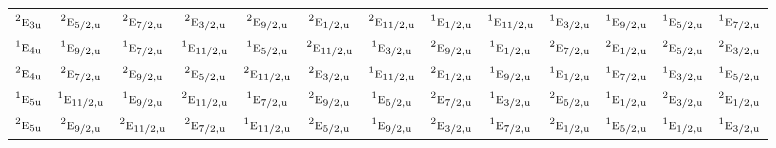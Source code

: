 \documentclass[10pt,a4paper]{article}
\numberwithin{equation}{section}
\newcommand{\irr}[1]{\text{\normalfont\scshape #1}}
\newcommand{\conjpair}[1]{{}^{#1}}
\newcommand{\ptag}[1]{\mathrm{#1}}
\begin{document}
{\begin{longtable}{@{}lcccccccccccc@{}}
$\conjpair{2}\irr{e}_{3\ptag{u}}$ & $\conjpair{2}\irr{e}_{5/2,\ptag{u}}$ & $\conjpair{2}\irr{e}_{7/2,\ptag{u}}$ & $\conjpair{2}\irr{e}_{3/2,\ptag{u}}$ & $\conjpair{2}\irr{e}_{9/2,\ptag{u}}$ & $\conjpair{2}\irr{e}_{1/2,\ptag{u}}$ & $\conjpair{2}\irr{e}_{11/2,\ptag{u}}$ & $\conjpair{1}\irr{e}_{1/2,\ptag{u}}$ & $\conjpair{1}\irr{e}_{11/2,\ptag{u}}$ & $\conjpair{1}\irr{e}_{3/2,\ptag{u}}$ & $\conjpair{1}\irr{e}_{9/2,\ptag{u}}$ & $\conjpair{1}\irr{e}_{5/2,\ptag{u}}$ & $\conjpair{1}\irr{e}_{7/2,\ptag{u}}$\\
$\conjpair{1}\irr{e}_{4\ptag{u}}$ & $\conjpair{1}\irr{e}_{9/2,\ptag{u}}$ & $\conjpair{1}\irr{e}_{7/2,\ptag{u}}$ & $\conjpair{1}\irr{e}_{11/2,\ptag{u}}$ & $\conjpair{1}\irr{e}_{5/2,\ptag{u}}$ & $\conjpair{2}\irr{e}_{11/2,\ptag{u}}$ & $\conjpair{1}\irr{e}_{3/2,\ptag{u}}$ & $\conjpair{2}\irr{e}_{9/2,\ptag{u}}$ & $\conjpair{1}\irr{e}_{1/2,\ptag{u}}$ & $\conjpair{2}\irr{e}_{7/2,\ptag{u}}$ & $\conjpair{2}\irr{e}_{1/2,\ptag{u}}$ & $\conjpair{2}\irr{e}_{5/2,\ptag{u}}$ & $\conjpair{2}\irr{e}_{3/2,\ptag{u}}$\\
$\conjpair{2}\irr{e}_{4\ptag{u}}$ & $\conjpair{2}\irr{e}_{7/2,\ptag{u}}$ & $\conjpair{2}\irr{e}_{9/2,\ptag{u}}$ & $\conjpair{2}\irr{e}_{5/2,\ptag{u}}$ & $\conjpair{2}\irr{e}_{11/2,\ptag{u}}$ & $\conjpair{2}\irr{e}_{3/2,\ptag{u}}$ & $\conjpair{1}\irr{e}_{11/2,\ptag{u}}$ & $\conjpair{2}\irr{e}_{1/2,\ptag{u}}$ & $\conjpair{1}\irr{e}_{9/2,\ptag{u}}$ & $\conjpair{1}\irr{e}_{1/2,\ptag{u}}$ & $\conjpair{1}\irr{e}_{7/2,\ptag{u}}$ & $\conjpair{1}\irr{e}_{3/2,\ptag{u}}$ & $\conjpair{1}\irr{e}_{5/2,\ptag{u}}$\\
$\conjpair{1}\irr{e}_{5\ptag{u}}$ & $\conjpair{1}\irr{e}_{11/2,\ptag{u}}$ & $\conjpair{1}\irr{e}_{9/2,\ptag{u}}$ & $\conjpair{2}\irr{e}_{11/2,\ptag{u}}$ & $\conjpair{1}\irr{e}_{7/2,\ptag{u}}$ & $\conjpair{2}\irr{e}_{9/2,\ptag{u}}$ & $\conjpair{1}\irr{e}_{5/2,\ptag{u}}$ & $\conjpair{2}\irr{e}_{7/2,\ptag{u}}$ & $\conjpair{1}\irr{e}_{3/2,\ptag{u}}$ & $\conjpair{2}\irr{e}_{5/2,\ptag{u}}$ & $\conjpair{1}\irr{e}_{1/2,\ptag{u}}$ & $\conjpair{2}\irr{e}_{3/2,\ptag{u}}$ & $\conjpair{2}\irr{e}_{1/2,\ptag{u}}$\\
$\conjpair{2}\irr{e}_{5\ptag{u}}$ & $\conjpair{2}\irr{e}_{9/2,\ptag{u}}$ & $\conjpair{2}\irr{e}_{11/2,\ptag{u}}$ & $\conjpair{2}\irr{e}_{7/2,\ptag{u}}$ & $\conjpair{1}\irr{e}_{11/2,\ptag{u}}$ & $\conjpair{2}\irr{e}_{5/2,\ptag{u}}$ & $\conjpair{1}\irr{e}_{9/2,\ptag{u}}$ & $\conjpair{2}\irr{e}_{3/2,\ptag{u}}$ & $\conjpair{1}\irr{e}_{7/2,\ptag{u}}$ & $\conjpair{2}\irr{e}_{1/2,\ptag{u}}$ & $\conjpair{1}\irr{e}_{5/2,\ptag{u}}$ & $\conjpair{1}\irr{e}_{1/2,\ptag{u}}$ & $\conjpair{1}\irr{e}_{3/2,\ptag{u}}$\\

\end{longtable}}
\end{document}
